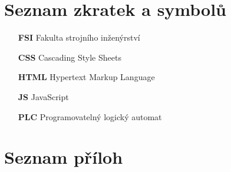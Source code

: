 \chapter*{Seznam zkratek a symbolů}
\label{chap:loa}
\begin{itemize}
    \item[\textbf{FSI}] Fakulta strojního inženýrství

    \item[\textbf{CSS}] Cascading Style Sheets
	
    \item[\textbf{HTML}] Hypertext Markup Language
	
    \item[\textbf{JS}] JavaScript
    
    \item[\textbf{PLC}] Programovatelný logický automat
\end{itemize}

\printbibliography[heading=bibintoc,title={Seznam zdrojů}]

\listoffigures

\listoftables

\chapter*{Seznam příloh}
